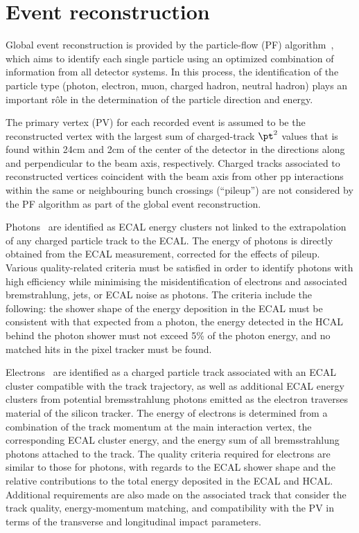 \section{Event reconstruction}
\label{sec:event_reconstruction}

Global event reconstruction is provided by the particle-flow (PF)
algorithm~\cite{CMS-PAS-PFT-09-001,CMS-PAS-PFT-10-001}, which aims to
identify each single particle using an optimized combination of
information from all detector systems. In this process, the
identification of the particle type (photon, electron, muon, charged
hadron, neutral hadron) plays an important r\^ole in the determination
of the particle direction and energy.

The primary vertex (PV) for each recorded event is assumed to be the
reconstructed vertex with the largest sum of charged-track $\pt^2$
values that is found within 24\unit{cm} and 2\unit{cm} of the center
of the detector in the directions along and perpendicular to the beam
axis, respectively. Charged tracks associated to reconstructed
vertices coincident with the beam axis from other pp interactions
within the same or neighbouring bunch crossings (``pileup'') are not
considered by the PF algorithm as part of the global event
reconstruction.

Photons~\cite{CMS:EGM-14-001} are identified as ECAL energy clusters
not linked to the extrapolation of any charged particle track to the
ECAL. The energy of photons is directly obtained from the ECAL
measurement, corrected for the effects of pileup. 
Various quality-related criteria must be satisfied in order to
identify photons with high efficiency while minimising the
misidentification of electrons and associated bremstrahlung, jets, 
or ECAL noise as photons. The criteria include the following: the
shower shape of the energy deposition in the ECAL must be consistent
with that expected from a photon, the energy detected in the HCAL
behind the photon shower must not exceed 5\% of the photon energy, and
no matched hits in the pixel tracker must be found. 

Electrons~\cite{Khachatryan:2015hwa} are identified as a charged
particle track associated with an ECAL cluster compatible with the
track trajectory, as well as additional ECAL energy clusters from
potential bremsstrahlung photons emitted as the electron traverses
material of the silicon tracker. The energy of electrons is determined
from a combination of the track momentum at the main interaction
vertex, the corresponding ECAL cluster energy, and the energy sum of
all bremsstrahlung photons attached to the track. The quality criteria
required for electrons are similar to those for photons, with regards
to the ECAL shower shape and the relative contributions to the total
energy deposited in the ECAL and HCAL. Additional requirements are
also made on the associated track that consider the track quality,
energy-momentum matching, and compatibility with the PV in terms of
the transverse and longitudinal impact parameters.

